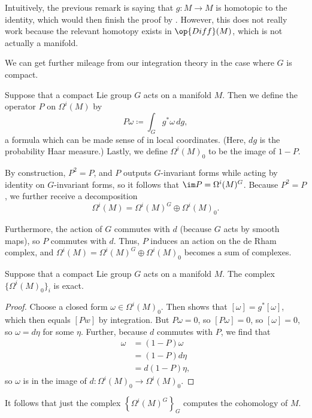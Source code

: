 \documentclass[../notes.tex]{subfiles}
\begin{document}
\begin{remark}
	Intuitively, the previous remark is saying that $g\colon M\to M$ is homotopic to the identity, which would then finish the proof by . However, this does not really work because the relevant homotopy exists in $\op{Diff}(M)$, which is not actually a manifold.
\end{remark}
We can get further mileage from our integration theory in the case where $G$ is compact.
\begin{notation}
	Suppose that a compact Lie group $G$ acts on a manifold $M$. Then we define the operator $P$ on $\Omega^i(M)$ by
	\[P\omega\coloneqq\int_Gg^*\omega\,dg,\]
	a formula which can be made sense of in local coordinates. (Here, $dg$ is the probability Haar measure.) Lastly, we define $\Omega^i(M)_0$ to be the image of $1-P$.
\end{notation}
\begin{remark}
	By construction, $P^2=P$, and $P$ outputs $G$-invariant forms while acting by identity on $G$-invariant forms, so it follows that $\im P=\Omega^i(M)^G$. Because $P^2=P$, we further receive a decomposition
	\[\Omega^i(M)=\Omega^i(M)^G\oplus\Omega^i(M)_0.\]
\end{remark}
\begin{remark}
	Furthermore, the action of $G$ commutes with $d$ (because $G$ acts by smooth maps), so $P$ commutes with $d$. Thus, $P$ induces an action on the de Rham complex, and $\Omega^i(M)=\Omega^i(M)^G\oplus\Omega^i(M)_0$ becomes a sum of complexes.
\end{remark}
\begin{proposition} \label{prop:compute-cohomology-by-invariants}
	Suppose that a compact Lie group $G$ acts on a manifold $M$. The complex $\{\Omega^i(M)_0\}_i$ is exact.
\end{proposition}
\begin{proof}
	Choose a closed form $\omega\in\Omega^i(M)_0$. Then  shows that $[\omega]=g^*[\omega]$, which then equals $[Pw]$ by integration. But $P\omega=0$, so $[P\omega]=0$, so $[\omega]=0$, so $\omega=d\eta$ for some $\eta$. Further, because $d$ commutes with $P$, we find that
	\begin{align*}
		\omega &= (1-P)\omega \\
		&= (1-P)d\eta \\
		&= d(1-P)\eta,
	\end{align*}
	so $\omega$ is in the image of $d\colon\Omega^i(M)_0\to\Omega^i(M)_0$.
\end{proof}
\begin{remark} \label{rem:pass-to-group-invariants}
	It follows that just the complex $\left\{\Omega^i(M)^G\right\}_G$ computes the cohomology of $M$.
\end{remark}
\end{document}
